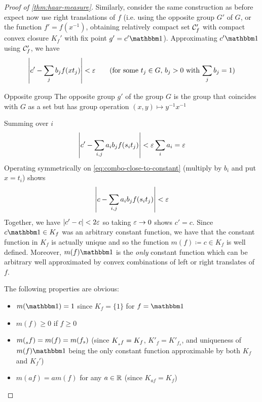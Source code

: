 \begin{proof}[Proof of \cref{thm:haar-measure}]
  Similarly, consider the same construction as before expect now use right
  translations of $f$ (i.e. using the opposite group $G'$ of $G$, or the function $f' =
  f(x^{-1})$, obtaining relatively compact set $\mathcal{C}_f'$ with compact convex
  closure $K_f'$ with fix point $g' = c' \ind$).
  Approximating $c' \ind$ using $\mathcal{C}_f'$, we have
  \begin{align}
    \left\lvert c' - \sum_j b_j f(x t_j) \right\rvert < \varepsilon
    \qquad(\text{for some $t_j \in G$, $b_j > 0$ with $\sum_j b_j = 1$})
  \end{align}
  \begin{note}{Opposite group}
    The opposite group $g'$ of the group $G$ is the group that
    coincides with $G$ as a set but has group operation
    $(x,y) \mapsto y^{-1} x^{-1}$
  \end{note}
  Summing over $i$
  \[
    \left\lvert c' - \sum_{i, j} a_i b_j f(s_i t_j) \right\rvert
    < \varepsilon \sum_i a_i
    = \varepsilon
  \]
  Operating symmetrically on \cref{eq:combo-close-to-constant}
  (multiply by $b_i$ and put $x = t_i$) shows
  \[
    \left\lvert c - \sum_{i, j} a_i b_j f(s_i t_j) \right\rvert
    < \varepsilon
  \]
  Together, we have $\lvert c' - c \rvert < 2 \varepsilon$ so taking $\varepsilon \to 0$
  shows $c' = c$. Since $c \ind \in K_f$ was an arbitrary constant function,
  we have that the constant function in $K_f$ is actually unique and so
  the function $m(f) \coloneqq c \in K_f$ is well defined. Moreover,
  $m(f) \ind$ is the \emph{only} constant function which can be arbitrary
  well approximated by convex combinations of left or right translates
  of $f$.

  The following properties are obvious:
  \begin{itemize}
    \item $m(\ind)= 1$ since $K_f = \{1\}$ for $f=\ind$
    \item $m(f) \geq 0$ if $f \geq 0$
    \item $m(\prescript{}{s}{f}) = m(f) = m(f_s)$ (since $K_{\prescript{}{s}{f}} = K_f$,
      $K'_f = K'_{f_s}$, and uniqueness of $m(f) \ind$ being the only
      constant function approximable by both $K_f$ and $K_f'$)
    \item $m(a f) = a m(f)$ for any $a \in \mathbb{R}$ (since $K_{af} = K_f$)
  \end{itemize}


\end{proof}
